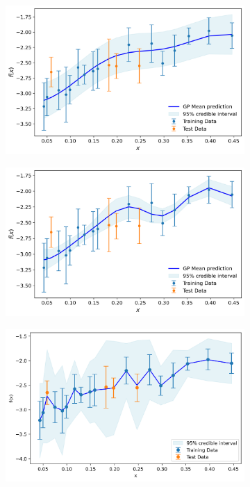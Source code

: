 \documentclass{article}
\begin{document}
\begin{figure}[H]
    \centering
    \begin{subfigure}[b]{0.3\textwidth}
        \centering
        \includegraphics[width=\textwidth]{LatexPlots/1dplots/GPRwhitekernel.png}
    \end{subfigure}
    \hfill
    \begin{subfigure}[b]{0.3\textwidth}
        \centering
        \includegraphics[width=\textwidth]{LatexPlots/1dplots/GPRerror2.png}
    \end{subfigure}
    \hfill
    \begin{subfigure}[b]{0.3\textwidth}
        \centering
        \includegraphics[width=\textwidth]{LatexPlots/1dplots/averagemontecarlosample.png}

\end{subfigure}
\end{figure}
\end{document}

